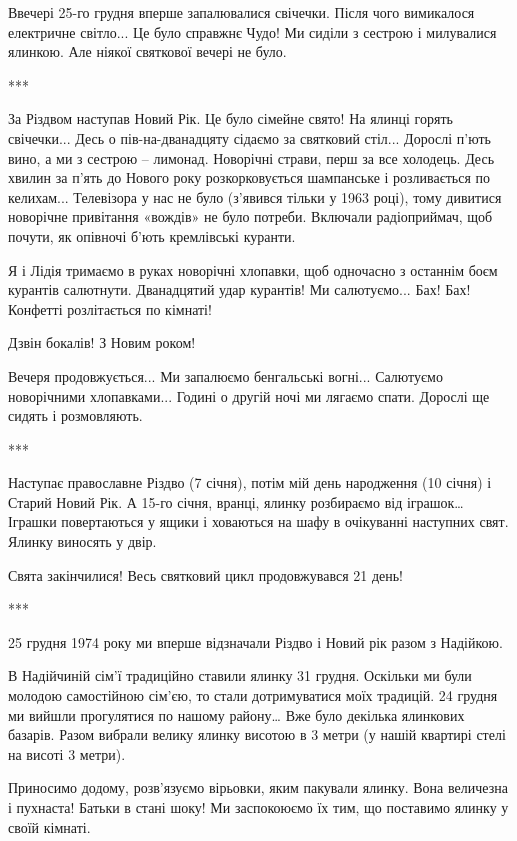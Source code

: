 
Ввечері 25-го грудня вперше запалювалися свічечки. Після чого вимикалося
електричне світло... Це було справжнє Чудо! Ми сиділи з сестрою і милувалися
ялинкою. Але ніякої святкової вечері не було.


***

За Різдвом наступав Новий Рік. Це було сімейне свято! На ялинці горять
свічечки... Десь о пів-на-дванадцяту сідаємо за святковий стіл... Дорослі п’ють
вино, а ми з сестрою – лимонад. Новорічні страви, перш за все холодець. Десь
хвилин за п’ять до Нового року розкорковується шампанське і розливається по
келихам... Телевізора у нас не було (з’явився тільки  у 1963 році), тому дивитися
новорічне привітання «вождів» не було потреби. Включали радіоприймач, щоб
почути, як опівночі б’ють кремлівські куранти. 


Я і Лідія тримаємо в руках новорічні хлопавки, щоб одночасно з останнім боєм
курантів салютнути. Дванадцятий удар курантів! Ми салютуємо... Бах! Бах! Конфетті
розлітається по кімнаті! 

Дзвін бокалів! З Новим роком! 

Вечеря продовжується... Ми запалюємо бенгальські вогні... Салютуємо новорічними
хлопавками... Годині о другій ночі ми лягаємо спати. Дорослі ще сидять і
розмовляють.

***

Наступає православне Різдво (7 січня), потім мій день народження (10 січня) і
Старий Новий Рік. А 15-го січня, вранці, ялинку розбираємо від іграшок… Іграшки
повертаються у ящики і ховаються на шафу в очікуванні наступних свят. Ялинку
виносять у двір.

Свята закінчилися! Весь святковий цикл продовжувався 21 день!

***

25 грудня 1974 року ми вперше відзначали Різдво і Новий рік разом з Надійкою. 

В Надійчиній сім’ї традиційно ставили ялинку 31 грудня. Оскільки ми були
молодою самостійною сім’єю, то стали дотримуватися моїх традицій. 24 грудня ми
вийшли прогулятися по нашому району… Вже було декілька ялинкових базарів. Разом
вибрали велику ялинку висотою в 3 метри (у нашій квартирі стелі на висоті 3
метри). 

Приносимо додому, розв’язуємо вірьовки, яким пакували ялинку. Вона величезна і
пухнаста! Батьки в стані шоку! Ми заспокоюємо їх тим, що поставимо ялинку у
своїй кімнаті.

